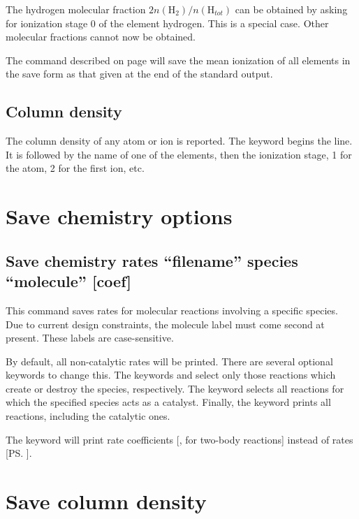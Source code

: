 The hydrogen molecular fraction $2n\left( {{\mathrm{H}}_2 } \right)/n\left(
{{\mathrm{H}}_{tot} } \right)$
can be obtained by asking for ionization stage 0 of the element hydrogen.
This is a special case.
Other molecular fractions cannot now be obtained.

The  command described on 
page \pageref{sec:CommandSaveIonizationMeans} will save
the mean ionization of all elements in the save form as that given
at the end of the standard output.

\subsection{Column density}

The column density of any atom or ion is reported.
The keyword
 begins the line.
It is followed by the name of one of the
elements, then the ionization stage, 1 for the atom,
2 for the first ion, etc.

\section{Save chemistry options}

\subsection{Save chemistry rates ``filename'' species ``molecule'' [coef]}
\label{s:savechemrate}

This command saves rates for molecular reactions involving a specific
species.  Due to current design constraints, the molecule label must come 
second at present.  These labels are case-sensitive.

By default, all non-catalytic rates will be printed.  
There are several optional keywords to change this.
The keywords  and 
select only those reactions which create or destroy the species, respectively.
The keyword  selects all reactions for which 
the specified species acts as a catalyst. 
Finally, the keyword  prints all reactions, including the catalytic ones.

The keyword  will print rate coefficients [\ccmps, for two-body reactions]
instead of rates [\ps].

\section{Save column density}

